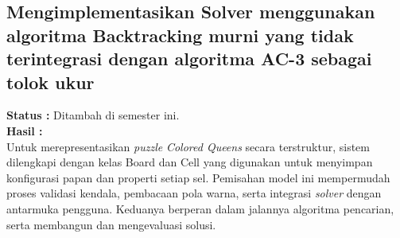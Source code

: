 \documentclass[a4paper,twoside]{article}
\begin{document}
	\subsection{Mengimplementasikan Solver menggunakan algoritma Backtracking murni yang tidak terintegrasi dengan algoritma AC-3 sebagai tolok ukur}
	{\bf Status :} Ditambah di semester ini.\\
	{\bf Hasil :}\\
	Untuk merepresentasikan \textit{puzzle} \textit{Colored Queens} secara terstruktur, sistem dilengkapi dengan kelas Board dan Cell yang digunakan untuk menyimpan konfigurasi papan dan properti setiap sel. Pemisahan model ini mempermudah proses validasi kendala, pembacaan pola warna, serta integrasi \textit{solver} dengan antarmuka pengguna. Keduanya berperan dalam jalannya algoritma pencarian, serta membangun dan mengevaluasi solusi.
\end{document}
